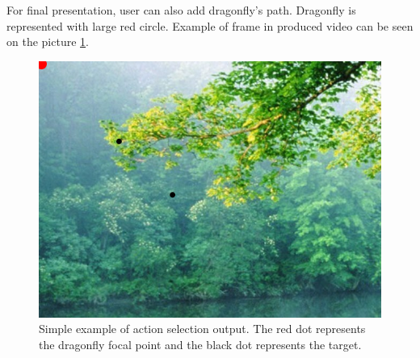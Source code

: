 \documentclass[hidelinks,a4paper,11pt]{article}
\begin{document}
For final presentation, user can also add dragonfly's path. Dragonfly is represented with large red circle.
Example of frame in produced video can be seen on the picture  \ref{target_animation_example}.

\begin{figure}[hb]
\centering
\includegraphics[scale = 0.3]{example}
\caption{Simple example of action selection output. The red dot represents the dragonfly focal point and the black dot represents the target.}
\label{target_animation_example}
\end{figure}
\end{document}
